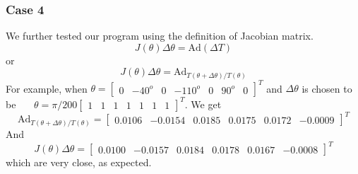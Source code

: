 \documentclass[english,10pt,a4paper]{article}
\begin{document}
    \subsubsection*{Case 4}
    We further tested our program using the definition of Jacobian matrix.
    \begin{equation}
        J(\theta)\Delta \theta = \text{Ad}(\Delta T)
    \end{equation}
    or
    \begin{equation}
        J(\theta)\Delta \theta = \text{Ad}_{T(\theta + \Delta \theta) / T(\theta)}
    \end{equation}
    For example, when $\theta = \begin{bmatrix}
        0 & -40^o & 0 & -110^o & 0 & 90^o & 0
    \end{bmatrix}^T$ and $\Delta\theta$ is chosen to be \ \ \ $\theta = \pi/200\begin{bmatrix}
        1 & 1 & 1 & 1 & 1 & 1 & 1
    \end{bmatrix}^T$. We get
    \begin{equation}
        \text{Ad}_{T(\theta + \Delta \theta) / T(\theta)} = \begin{bmatrix}
                0.0106 &   -0.0154 &   0.0185 &   0.0175 &   0.0172 &  -0.0009
        \end{bmatrix}^T
    \end{equation}
    And 
    \begin{equation}
        J(\theta)\Delta \theta = \begin{bmatrix}
                0.0100 &   -0.0157 &   0.0184 &   0.0178 &   0.0167 &  -0.0008
        \end{bmatrix}^T
    \end{equation}
    which are very close, as expected.
\end{document}
